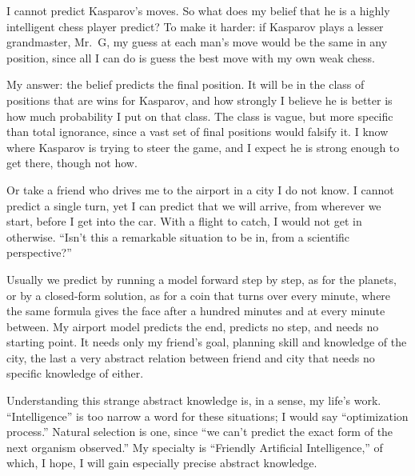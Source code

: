 
I cannot predict Kasparov's moves. So what does my belief that he is a highly intelligent chess player predict?  To make it harder: if Kasparov plays a lesser grandmaster, Mr.~G, my guess at each man's move would be the same in any position, since all I can do is guess the best move with my own weak chess. 

My answer: the belief predicts the final position. It will be in the class of positions that are wins for Kasparov, and how strongly I believe he is better is how much probability I put on that class. The class is vague, but more specific than total ignorance, since a vast set of final positions would falsify it. I know where Kasparov is trying to steer the game, and I expect he is strong enough to get there, though not how. 

Or take a friend who drives me to the airport in a city I do not know. I cannot predict a single turn, yet I can predict that we will arrive, from wherever we start, before I get into the car. With a flight to catch, I would not get in otherwise. ``Isn't this a remarkable situation to be in, from a scientific perspective?'' 

Usually we predict by running a model forward step by step, as for the planets, or by a closed-form solution, as for a coin that turns over every minute, where the same formula gives the face after a hundred minutes and at every minute between. My airport model predicts the end, predicts no step, and needs no starting point. It needs only my friend's goal, planning skill and knowledge of the city, the last a very abstract relation between friend and city that needs no specific knowledge of either.

Understanding this strange abstract knowledge is, in a sense, my life's work. ``Intelligence'' is too narrow a word for these situations; I would say ``optimization process.'' Natural selection is one, since ``we can't predict the exact form of the next organism observed.''  My specialty is ``Friendly Artificial Intelligence,'' of which, I hope, I will gain especially precise abstract knowledge.
